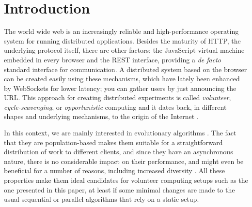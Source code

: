 \documentclass{llncs}
\begin{document}
\section{Introduction}

The world wide web is an increasingly reliable and high-performance
operating system for running distributed applications. Besides the
maturity of HTTP, the underlying protocol itself, there are other
factors: the JavaScript virtual machine embedded in every browser
and the REST interface, providing a {\em de facto} standard interface for
communication. A distributed system based on the browser can be
created easily using these mechanisms, which have lately been enhanced
by WebSockets for lower latency; you can gather users by just
announcing the URL. This approach for creating distributed experiments is called {\em
  volunteer}, {\em cycle-scavenging}, or {\em opportunistic} computing
\cite{sarmenta2001volunteer} and it dates back, in different shapes
and underlying mechanisms, to the origin of the Internet
\cite{david-seti:home}.

In this context, we are mainly interested in evolutionary algorithms
\cite{milani2004online,sherry2012flex,jj-ppsn98}%
. The fact that they are population-based makes them suitable for a
straightforward distribution of work to different clients, and since
they have an asynchronous nature, there is no considerable impact on
their performance, and might even be beneficial for a number of
reasons, including increased diversity
\cite{cantu-paz:migration-policies}. All these properties make them
ideal candidates for volunteer computing setups such as the one
presented in this paper, at least if some minimal changes are made to
the usual sequential or parallel algorithms that rely on a static
setup. 
\end{document}
